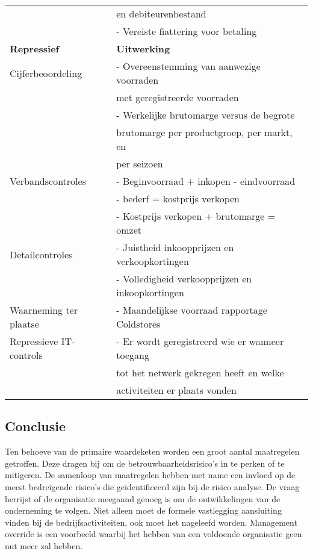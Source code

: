 \begin{table}[h!]
\begin{tabular}{l l}
        & en debiteurenbestand \\
        & - Vereiste fiattering voor betaling \\
        \midrule
        \textbf{Repressief} & \textbf{Uitwerking} \\
        \midrule
        Cijferbeoordeling & - Overeenstemming van aanwezige voorraden  \\
        & met geregistreerde voorraden \\
        & - Werkelijke brutomarge versus de begrote \\
        & brutomarge per productgroep, per markt, en \\
        & per seizoen \\
        Verbandscontroles & - Beginvoorraad + inkopen - eindvoorraad \\
        & - bederf = kostprijs verkopen \\
        & - Kostprijs verkopen + brutomarge = omzet \\
        Detailcontroles & - Juistheid inkoopprijzen en verkoopkortingen \\
        & - Volledigheid verkoopprijzen en inkoopkortingen \\
        Waarneming ter plaatse & - Maandelijkse voorraad rapportage Coldstores\\
        Repressieve IT-controls & - Er wordt geregistreerd wie er wanneer toegang \\
        & tot het netwerk gekregen heeft en welke \\
        & activiteiten er plaats vonden \\
        \bottomrule
    \end{tabular}
    \label{tab:maatregelen}
\end{table}

\newpage

\subsection*{Conclusie}
Ten behoeve van de primaire waardeketen worden een groot aantal maatregelen getroffen. Deze dragen bij om de betrouwbaarheidsrisico's in te perken of te mitigeren. De samenloop van maatregelen hebben met name een invloed op de meest bedreigende risico's die geïdentificeerd zijn bij de risico analyse. De vraag herrijst of de organisatie meegaand genoeg is om de ontwikkelingen van de onderneming te volgen. Niet alleen moet de formele vastlegging aansluiting vinden bij de bedrijfsactiviteiten, ook moet het nageleefd worden. Management override is een voorbeeld waarbij het hebben van een voldoende organisatie geen nut meer zal hebben. 